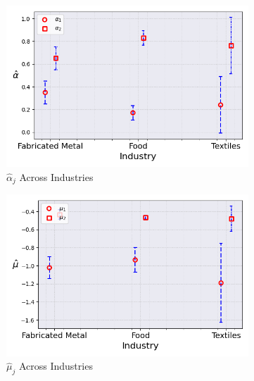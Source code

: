 \documentclass{article}
\begin{document}
\begin{figure}[ht!]
    \centering 
    \caption{Stationary Normal Model Across Industries ($M_0 = 2$)}
    \begin{subfigure}[t]{0.32\textwidth}
        \centering
        \includegraphics[width=\textwidth]{figure/stationary_normal_alpha_across_industries_m2.png}
        \caption{$\hat\alpha_j$ Across Industries}
    \end{subfigure}
    \begin{subfigure}[t]{0.32\textwidth}
        \centering
        \includegraphics[width=\textwidth]{figure/stationary_normal_mu_across_industries_m2.png}
        \caption{$\hat\mu_j$ Across Industries}
    \end{subfigure}
    \begin{subfigure}[t]{0.32\textwidth}
        \centering

\end{subfigure}
\end{figure}
\end{document}
